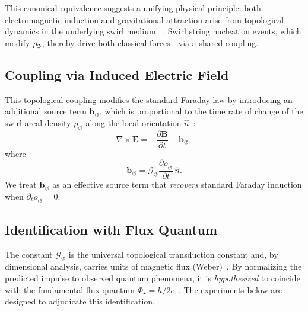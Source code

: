 \documentclass[10pt,reprint,aps,onecolumn,nofootinbib]{revtex4-2}
\newcommand{\vect}[1]{\boldsymbol{#1}} %
\newcommand{\EE}{\vect{E}}
\newcommand{\BB}{\vect{B}}
\begin{document}
        This canonical equivalence suggests a unifying physical principle: both electromagnetic induction and gravitational attraction arise from topological dynamics in the underlying swirl medium~ \cite{EM_G}. Swirl string nucleation events, which modify \(\rho_{\mkern-2mu\scriptscriptstyle\boldsymbol{\circlearrowleft}}\), thereby drive both classical forces—via a shared coupling.

    \subsection*{Coupling via Induced Electric Field}
        This topological coupling modifies the standard Faraday law by introducing an additional source term $\vect{b}_{\circlearrowleft}$, which is proportional to the time rate of change of the swirl areal density $\rho_{\circlearrowleft}$ along the local orientation $\hat{n}$~\cite{EM_G}:
        \begin{equation} \label{eq:modfaraday}
            \nabla \times \EE = - \frac{\partial \BB}{\partial t} - \vect{b}_{\circlearrowleft},
        \end{equation}
        where
        \[
            \vect{b}_{\circlearrowleft} = \mathcal{G}_{\circlearrowleft} \frac{\partial \rho_{\circlearrowleft}}{\partial t} \,\hat{n}.
        \]
        We treat $\vect{b}_{\circlearrowleft}$ as an effective source term that \emph{recovers} standard Faraday induction when $\partial_t \rho_{\circlearrowleft}=0$.

    \subsection*{Identification with Flux Quantum}
        The constant $\mathcal{G}_{\circlearrowleft}$ is the universal topological transduction constant and, by dimensional analysis, carries units of magnetic flux (Weber)~\cite{EM_G}. By normalizing the predicted impulse to observed quantum phenomena, it is \emph{hypothesized} to coincide with the fundamental flux quantum $\Phi_\star=h/2e$~\cite{EM_G}. The experiments below are designed to adjudicate this identification.
\end{document}

